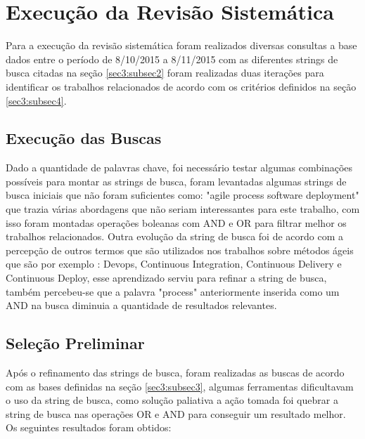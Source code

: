 \documentclass[12pt]{article}
\begin{document}
\section{Execução da Revisão Sistemática} \label{sec4}

Para a execução da revisão sistemática foram realizados diversas consultas a base dados entre o período de  8/10/2015 a 8/11/2015 com as diferentes strings de busca citadas na seção \ref{sec3:subsec2} foram realizadas duas iterações para identificar os trabalhos relacionados de acordo com os critérios definidos na seção \ref{sec3:subsec4}.

\subsection{Execução das Buscas} \label{sec4:subsec1}

Dado a quantidade de palavras chave, foi necessário testar algumas combinações possíveis para montar as strings de busca, foram levantadas algumas strings de busca iniciais que não foram suficientes como: "agile process software deployment" que trazia várias abordagens que não seriam interessantes para este trabalho, com isso foram montadas operações boleanas com AND e OR para filtrar melhor os trabalhos relacionados. Outra evolução da string de busca foi de acordo com a percepção de outros termos que são utilizados nos trabalhos sobre métodos ágeis que são por exemplo : Devops, Continuous Integration, Continuous Delivery e Continuous Deploy, esse aprendizado serviu para refinar a string de busca, também percebeu-se que a palavra "process" anteriormente inserida como um AND na busca diminuia a quantidade de resultados relevantes.

\subsection{Seleção Preliminar} \label{sec4:subsec2}
Após o refinamento das strings de busca, foram realizadas as buscas de acordo com as bases definidas na seção \ref{sec3:subsec3}, algumas ferramentas dificultavam o uso da string de busca, como solução paliativa a ação tomada foi quebrar a string de busca nas operações OR e AND para conseguir um resultado melhor. Os seguintes resultados foram obtidos:
\end{document}
